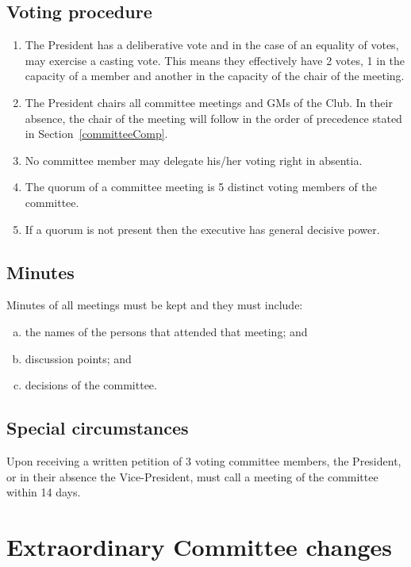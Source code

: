 \documentclass{constitution}
\begin{document}
\subsection{Voting procedure}\label{committeeMeetingVotingProcedure}
\begin{enumerate}[(1)]
    \item The President has a deliberative vote and in the case of an equality of votes, may exercise a casting vote. This means they effectively have 2 votes, 1 in the capacity of a member and another in the capacity of the chair of the meeting.
    \item The President chairs all committee meetings and GMs of the Club. In their absence, the chair of the meeting will follow in the order of precedence stated in Section~\ref{committeeComp}.
    \item No committee member may delegate his/her voting right in absentia.
    \item The quorum of a committee meeting is 5 distinct voting members of the committee.
    \item If a quorum is not present then the executive has general decisive power.
\end{enumerate}

\subsection{Minutes}
Minutes of all meetings must be kept and they must include:
\begin{enumerate}[(a)]
    \item the names of the persons that attended that meeting; and
    \item discussion points; and
    \item decisions of the committee.
\end{enumerate}

\subsection{Special circumstances}
Upon receiving a written petition of 3 voting committee members, the President, or in their absence the Vice-President, must call a meeting of the committee within 14 days.

\section{Extraordinary Committee changes}\label{extraordinaryCommitteeChanges}
\end{document}
